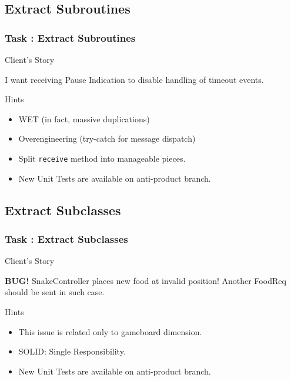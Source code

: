 \documentclass[english]{beamer}
\newenvironment{narrowblock}[1]{%
\begin{center}
\begin{minipage}{10.5cm}
\begin{block}{#1}
}{%
\end{block}
\end{minipage}
\end{center}
}
\begin{document}
\subsection{Extract Subroutines}

\begin{frame}
\frametitle{Task \thesubsection: Extract Subroutines}

\begin{narrowblock}{Client's Story}
I want receiving Pause Indication to disable handling of timeout events.
\end{narrowblock}

\pause
\begin{narrowblock}{Hints}
\begin{itemize}[<+->]
\item WET (in fact, massive duplications)
\item Overengineering (try-catch for message dispatch\textellipsis)
\item Split \texttt{receive} method into manageable pieces.
\item New Unit Tests are available on anti-product branch.
\end{itemize}
\end{narrowblock}
\end{frame}

\subsection{Extract Subclasses}

\begin{frame}
\frametitle{Task \thesubsection: Extract Subclasses}

\begin{narrowblock}{Client's Story}
\textbf{BUG!} SnakeController places new food at invalid position! Another FoodReq should be sent in such case.
\end{narrowblock}

\pause
\begin{narrowblock}{Hints}
\begin{itemize}[<+->]
\item This issue is related only to gameboard dimension.
\item SOLID: Single Responsibility.
\item New Unit Tests are available on anti-product branch.
\end{itemize}
\end{narrowblock}
\end{frame}
\end{document}
